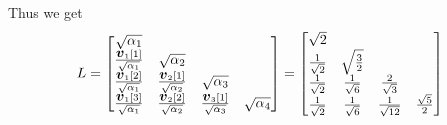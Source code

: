 \begin{example}
Thus we get
\[
L= \begin{bmatrix}
\sqrt{\alpha_1} \\
{\bm{{\mbox{\boldmath$v$\unboldmath}}}_1[1] \over \sqrt{\alpha_1}} & \sqrt{\alpha_2} \\
{\bm{{\mbox{\boldmath$v$\unboldmath}}}_1[2] \over \sqrt{\alpha_1}} & {\bm{{\mbox{\boldmath$v$\unboldmath}}}_2[1] \over \sqrt{\alpha_2}}  & \sqrt{\alpha_3} \\
{\bm{{\mbox{\boldmath$v$\unboldmath}}}_1[3] \over \sqrt{\alpha_1}} & {\bm{{\mbox{\boldmath$v$\unboldmath}}}_2[2] \over \sqrt{\alpha_2}}  & {\bm{{\mbox{\boldmath$v$\unboldmath}}}_3[1] \over \sqrt{\alpha_3}}  & \sqrt{\alpha_4}
\end{bmatrix}
 = \begin{bmatrix} \sqrt{2} \\ {1 \over \sqrt{2}} & \sqrt{3 \over 2} \\
{1 \over \sqrt{2}} & {1 \over \sqrt 6} & {2 \over \sqrt{3}} \\
{1 \over \sqrt{2}} & {1 \over \sqrt 6} & {1 \over \sqrt{12}} & {\sqrt{5} \over 2}
\end{bmatrix}
\]
\end{example}




